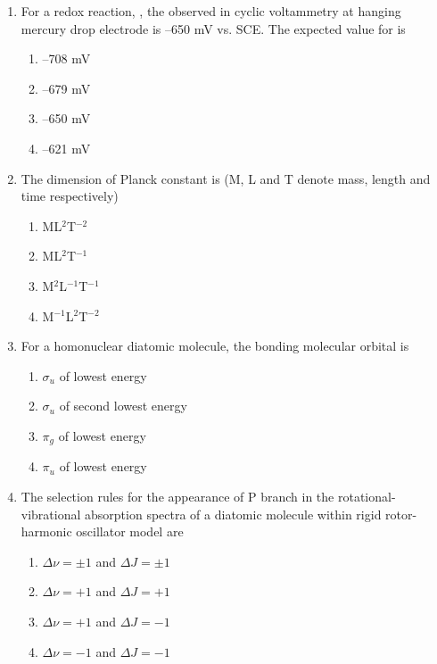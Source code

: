 \documentclass[journal,12pt,onecolumn]{IEEEtran}
\theoremstyle{remark}
\begin{document}
\begin{enumerate}
\item For a redox reaction, , the  observed in cyclic voltammetry at hanging mercury drop electrode is --650 mV vs. SCE. The expected value for  is \hfill{}
\begin{multicols}{2}
\begin{enumerate}[leftmargin=*,labelsep=1em]
     \item   --708 mV
     \item   --679 mV
     \item   --650 mV
     \item   --621 mV
\end{enumerate}
\end{multicols}
  

\item The dimension of Planck constant is (M, L and T denote mass, length and time respectively) \hfill{}
\begin{multicols}{2}
\begin{enumerate}[leftmargin=*,labelsep=1em]
     \item   ML$^2$T$^{-2}$
     \item   ML$^2$T$^{-1}$
     \item   M$^2$L$^{-1}$T$^{-1}$
     \item   M$^{-1}$L$^2$T$^{-2}$
\end{enumerate}
\end{multicols}
  

\item For a homonuclear diatomic molecule, the bonding molecular orbital is \hfill{}
\begin{multicols}{2}
\begin{enumerate}[leftmargin=*,labelsep=1em]
     \item   $\sigma_u$ of lowest energy
     \item   $\sigma_u$ of second lowest energy
     \item   $\pi_g$ of lowest energy
     \item   $\pi_u$ of lowest energy
\end{enumerate}
\end{multicols}
  

\item The selection rules for the appearance of P branch in the rotational-vibrational absorption spectra of a diatomic molecule within rigid rotor-harmonic oscillator model are \hfill{}
\begin{multicols}{2}
\begin{enumerate}[leftmargin=*,labelsep=1em]
     \item   $\Delta \nu = \pm 1$ and $\Delta J = \pm 1$
     \item   $\Delta \nu = +1$ and $\Delta J = +1$
     \item   $\Delta \nu = +1$ and $\Delta J = -1$
     \item   $\Delta \nu = -1$ and $\Delta J = -1$
\end{enumerate}
\end{multicols}
 


\end{enumerate}
\end{document}
